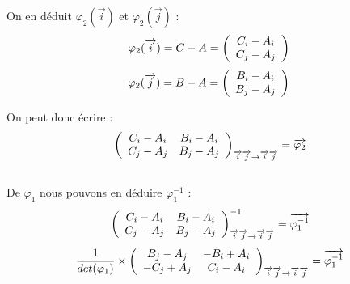\documentclass[a4paper, 12pt]{report}
\begin{document}
		On en déduit $\varphi _{2} (\overrightarrow{i})$ et $\varphi _{2} (\overrightarrow{j})$ :
		$$
		\varphi _{2} (\overrightarrow{i}) = C - A = \left(\begin{array}{c}
		C _{i} - A _{i} \\
		C _{j} - A _{j}
		\end{array}
		\right)
		\\
		$$
		$$
		\varphi _{2} (\overrightarrow{j}) = B - A = \left(\begin{array}{c}
		B _{i} - A _{i} \\
		B _{j} - A _{j}
		\end{array}
		\right)
		\\
		$$
		
		On peut donc écrire :
		$$
		\left(\begin{array}{cc}
		C _{i} - A _{i} & B _{i} - A _{i} \\
		C _{j} - A _{j} & B _{j} - A _{j} 
		\end{array}
		\right) _{\overrightarrow{i}\overrightarrow{j} \rightarrow \overrightarrow{i}\overrightarrow{j}} = {\cal \overrightarrow{\varphi _{2}}}
		$$
		\\
		
		De $\varphi_{1}$ nous pouvons en déduire $\varphi _{1}^{-1}$ :
		\\
		$$
		\left(\begin{array}{cc}
		C _{i} - A _{i} & B _{i} - A _{i} \\
		C _{j} - A _{j} & B _{j} - A _{j} 
		\end{array}
		\right) _{\overrightarrow{i}\overrightarrow{j} \rightarrow \overrightarrow{i}\overrightarrow{j}} ^{-1} = {\cal \overrightarrow{\varphi _{1}^{-1}}}
		\\
		$$
		$$
		\frac{1}{det(\varphi _{1})}\times \left(\begin{array}{cc}
		B _{j} - A _{j} & -B _{i} + A _{i} \\
		-C _{j} + A _{j} & C _{i} - A _{i}  
		\end{array}
		\right) _{\overrightarrow{i}\overrightarrow{j} \rightarrow \overrightarrow{i}\overrightarrow{j}} = {\cal \overrightarrow{\varphi _{1}^{-1}}}
		\\
		$$
\end{document}
